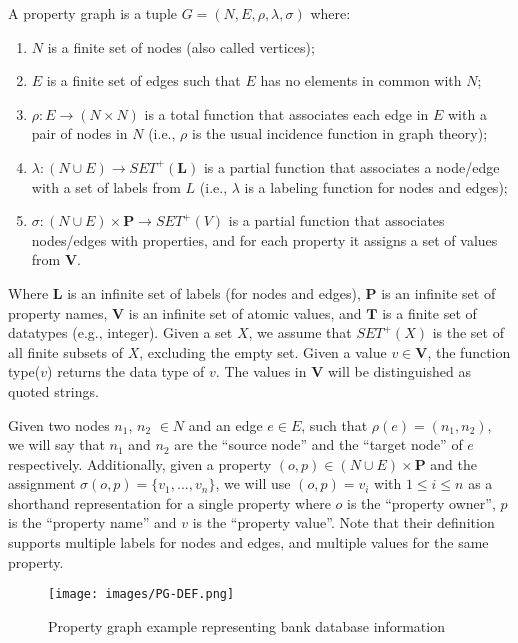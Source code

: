 \begin{definition}
A property graph is a tuple $G=(N,E, \rho, \lambda, \sigma)$ where:
\begin{enumerate}
    \item $N$ is a finite set of nodes (also called vertices);
    \item $E$ is a finite set of edges such that $E$ has no elements in common with $N$;
    \item $\rho: E \rightarrow (N \times N)$ is a total function that associates each edge in $E$ with a pair of nodes in $N$ (i.e., $\rho$ is the usual incidence function in graph theory);
    \item $\lambda: (N \cup E) \rightarrow SET^{+}(\textbf{L})$ is a partial function that associates a node/edge with a set of labels from $L$ (i.e., $\lambda$ is a labeling function for nodes and edges);
    \item $\sigma: (N \cup E) \times \textbf{P} \rightarrow SET^{+}(V)$ is a partial function that associates nodes/edges with properties, and for each property it assigns a set of values from $\textbf{V}$.
\end{enumerate}
Where $\textbf{L}$ is an infinite set of labels (for nodes and edges), $\textbf{P}$ is an
infinite set of property names, $\textbf{V}$ is an infinite set of atomic values, and $\textbf{T}$ is a finite set of datatypes (e.g., integer). Given a set $X$, we assume that $SET^{+}(X)$ is the set of all finite subsets of $X$, excluding the empty set. Given a value $v \in \textbf{V}$, the function type($v$) returns the data type of $v$. The values in $\textbf{V}$ will be distinguished as quoted strings.
\end{definition}

Given two nodes $n_1$, $n_2$ $\in N$ and an edge $e \in E$, such that $\rho(e) = (n_1, n_2)$,
we will say that $n_1$ and $n_2$ are the “source node” and the “target node” of
$e$ respectively. Additionally, given a property $(o, p) \in (N \cup E) \times \textbf{P}$ and the
assignment $\sigma(o, p) = \{v_1,...,v_n\}$, we will use $(o, p) = v_i$ with $1 \leq i \leq n$ as a shorthand representation for a single property where $o$ is the “property owner”,
$p$ is the “property name” and $v$ is the “property value”. Note that their definition
supports multiple labels for nodes and edges, and multiple values for the same
property.

\begin{figure}[H]
    \centering
    \texttt{[image: images/PG-DEF.png]}
    \caption{Property graph example representing bank database information}
    \label{img:PG-example}
\end{figure}

